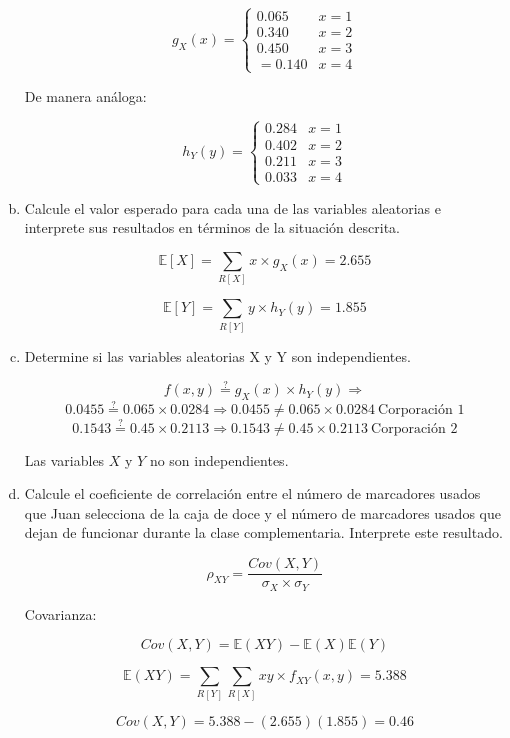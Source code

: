 \documentclass[../main.tex]{subfiles}
\begin{document}
\begin{enumerate}[(a)]
\[ g_{X}(x) = \begin{cases} 
      0.065 & x = 1\\
      0.340 & x = 2\\
      0.450 & x = 3\\
      = 0.140 & x = 4
   \end{cases}
\]

De manera análoga: 

\[ h_{Y}(y) = \begin{cases} 
      0.284 & x = 1\\
      0.402 & x = 2\\
      0.211 & x = 3\\
      0.033 & x = 4
   \end{cases}
\]

\pagebreak

\item Calcule el valor esperado para cada una de las variables aleatorias e
interprete sus resultados en términos de la situación descrita.

$$\mathbb{E}[X] = \sum_{R[X]} x \times g_{X}(x) = 2.655$$

$$\mathbb{E}[Y] = \sum_{R[Y]} y \times h_{Y}(y) = 1.855$$

\item Determine si las variables aleatorias X y Y son independientes.

$$f(x, y) \stackrel{?}{=} g_{X}(x) \times h_{Y}(y) \Rightarrow $$
$$0.0455 \stackrel{?}{=} 0.065 \times 0.0284 \Rightarrow  0.0455 \neq 0.065 \times 0.0284 \ \text{Corporación 1}$$
$$0.1543 \stackrel{?}{=} 0.45 \times 0.2113 \Rightarrow  0.1543 \neq 0.45 \times 0.2113 \ \text{Corporación 2}$$

Las variables $X$ y $Y$ no son independientes.

\item Calcule el coeficiente de correlación entre el número de marcadores
usados que Juan selecciona de la caja de doce y el número de marcadores usados
que dejan de funcionar durante la clase complementaria. Interprete este resultado.

$$\rho_{XY} = \frac{Cov(X, Y)}{\sigma_{X} \times \sigma_{Y}}$$

Covarianza: 

$$Cov(X, Y) = \mathbb{E}(XY) -  \mathbb{E}(X) \mathbb{E}(Y)$$

$$\mathbb{E}(XY) = \sum_{R[Y]}\sum_{R[X]} xy \times f_{XY}(x, y) = 5.388$$

$$Cov(X, Y) = 5.388 -  (2.655)(1.855) = 0.46$$


\end{enumerate}
\end{document}
